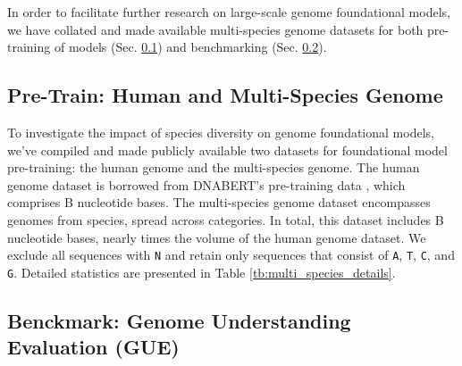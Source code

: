 \documentclass{article}
\begin{document}
In order to facilitate further research on large-scale genome foundational models, we have collated and made available multi-species genome datasets for both pre-training of models (Sec. \ref{subsec:data_pretrain}) and benchmarking (Sec. \ref{subsec:data_finetune}).

\subsection{Pre-Train: Human and Multi-Species Genome}
\label{subsec:data_pretrain}

To investigate the impact of species diversity on genome foundational models, we've compiled and made publicly available two datasets for foundational model pre-training: the human genome and the multi-species genome. The human genome dataset is borrowed from DNABERT's pre-training data \citep{dnabert}, which comprises B nucleotide bases. The multi-species genome dataset encompasses genomes from  species, spread across  categories. In total, this dataset includes B nucleotide bases, nearly  times the volume of the human genome dataset. We exclude all sequences with \texttt{N} and retain only sequences that consist of \texttt{A}, \texttt{T}, \texttt{C}, and \texttt{G}. Detailed statistics are presented in Table \ref{tb:multi_species_details}.


\subsection{Benckmark: Genome Understanding Evaluation (GUE)}
\label{subsec:data_finetune}
\end{document}
